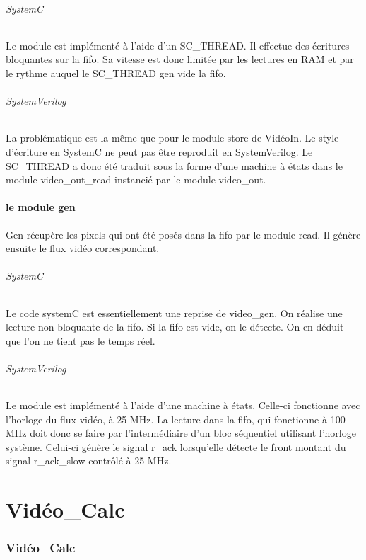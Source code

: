 \documentclass[a4paper,12pt]{report}
\begin{document}
{{\paragraph{SystemC}
Le module est implémenté à l'aide d'un SC\_THREAD.
Il effectue des écritures bloquantes sur la fifo.
Sa vitesse est donc limitée par les lectures en RAM et
par le rythme auquel le SC\_THREAD gen vide la fifo.

\paragraph{SystemVerilog}
La problématique est la même que pour le module store de VidéoIn.
Le style d'écriture en SystemC ne peut pas être reproduit en SystemVerilog.
Le SC\_THREAD a donc été traduit sous la forme d'une machine à états dans le module video\_out\_read instancié par le module video\_out.

\subsection{le module gen}
Gen récupère les pixels qui ont été posés dans la fifo par le module read.
Il génère ensuite le flux vidéo correspondant.

\paragraph{SystemC}
Le code systemC est essentiellement une reprise de video\_gen.
On réalise une lecture non bloquante de la fifo.
Si la fifo est vide, on le détecte.
On en déduit que l'on ne tient pas le temps réel.

\paragraph{SystemVerilog}
Le module est implémenté à l'aide d'une machine à états.
Celle-ci fonctionne avec l'horloge du flux vidéo, à 25 MHz.
La lecture dans la fifo, qui fonctionne à 100 MHz doit donc se faire
par l'intermédiaire d'un bloc séquentiel utilisant l'horloge système.
Celui-ci génère le signal r\_ack lorsqu'elle détecte le front montant
du signal r\_ack\_slow contrôlé à 25 MHz.


    \part{Vidéo\_Calc}
    \section*{Vidéo\_Calc}

}}
\end{document}
